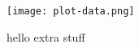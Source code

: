 \documentclass{article}
\begin{document}
\texttt{[image: plot-data.png]}

hello extra stuff
\end{document}

